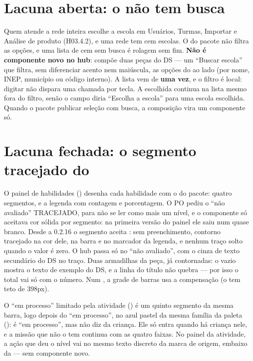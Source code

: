 \section{Lacuna aberta: o  não tem busca}

Quem atende a rede inteira escolhe a escola em Usuários, Turmas, Importar e
Análise de produto (H03.4.2), e uma rede tem cem escolas. O  do
pacote não filtra as opções, e uma lista de cem sem busca é rolagem sem fim.
\textbf{Não é componente novo no hub}: 
compõe duas peças do DS --- um  \enquote{Buscar escola} que filtra,
sem diferenciar acento nem maiúscula, as opções do  ao lado (por
nome, INEP, município ou código interno). A lista vem de
 \textbf{uma vez}, e o filtro é local: digitar não
dispara uma chamada por tecla. A escolhida continua na lista mesmo fora do
filtro, senão o campo diria \enquote{Escolha a escola} para uma escola escolhida.
Quando o pacote publicar seleção com busca, a composição vira um componente só.

\section{Lacuna fechada: o segmento tracejado do }

O painel de habilidades () desenha cada habilidade com o
 do pacote: quatro segmentos, e a legenda com contagem e
porcentagem. O PO pediu o \enquote{não avaliado} TRACEJADO, para não se ler
como mais um nível, e o componente só aceitava cor sólida por segmento: na
primeira versão do painel ele saiu num quase branco. Desde a 0.2.16 o segmento
aceita : sem preenchimento, contorno tracejado na cor
dele, na barra e no marcador da legenda, e nenhum traço solto quando o valor é
zero. O hub passa  só no \enquote{não avaliado}, com o cinza de
texto secundário do DS no traço. Duas armadilhas da peça, já contornadas: o
 vazio mostra o texto de exemplo do DS, e a linha do título não
quebra --- por isso o total vai só com o número. Num , a grade de
barras usa a compensação  (o  tem teto
de 398px).

O \enquote{em processo} limitado pela atividade () é um quinto
segmento da mesma barra, logo depois do \enquote{em processo}, no azul pastel
da mesma família da paleta (): é \enquote{em processo}, mas não
diz da criança. Ele só entra quando há criança nele, e a missão que não o tem
continua com as quatro faixas. No painel da atividade, a ação que deu o nível
vai no mesmo texto discreto da marca de origem, embaixo da  --- sem
componente novo.

